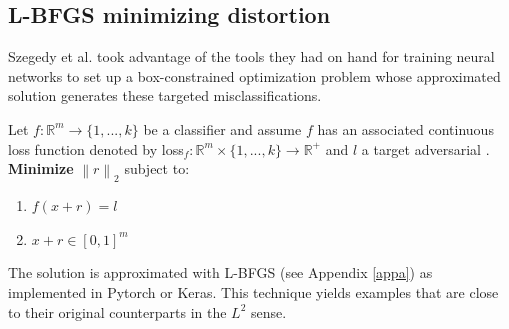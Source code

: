 \documentclass[10pt]{extarticle}
\newcommand{\R}{\mathbb{R}}
\newcommand{\Norm}[1]{\left\lVert #1 \right\rVert}
\begin{document}
\subsection{L-BFGS minimizing distortion}\label{lbfgs}

Szegedy et al. took advantage of the tools they had on hand for training neural networks to set up a box-constrained optimization problem whose approximated solution generates these targeted misclassifications. 


Let $f : \R^m \to \{1,...,k\}$ be a classifier and assume $f$ has an associated continuous loss function denoted by loss$_f : \R^m \times \{1,...,k\} \to \R^+$ and $l$ a target adversarial . \\
\textbf{ Minimize} $\Norm{r}_2$ subject to:
\begin{enumerate}[1.]
\item $f(x + r) = l$
\item $x + r \in [0,1]^m$
\end{enumerate}

The solution is approximated with L-BFGS (see Appendix \ref{appa}) as implemented in Pytorch or Keras. This technique yields examples that are close to their original counterparts in the $L^2$ sense.  \\


\end{document}
